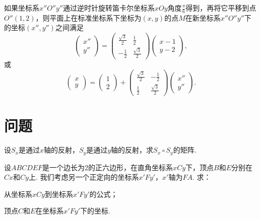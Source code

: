 \begin{example}
  如果坐标系$x''O''y''$通过逆时针旋转笛卡尔坐标系$xOy$角度$\frac\pi6$得到，再将它平移到点$O''(1,2)$，则平面上在标准坐标系下坐标为$(x,y)$的点$M$在新坐标系$x''O''y''$下的坐标$(x'',y'')$之间满足
  \[
    \begin{pmatrix}
      x'' \\
      y''
    \end{pmatrix} = \begin{pmatrix}
      \frac{\sqrt3}2 & \frac12 \\
      -\frac12 & \frac{\sqrt3}2
    \end{pmatrix}
    \begin{pmatrix}
      x-1 \\
      y-2
    \end{pmatrix},
  \]
  或
  \[
    \begin{pmatrix}
      x \\
      y
    \end{pmatrix} =
    \begin{pmatrix}
      1 \\
      2
    \end{pmatrix} +
    \begin{pmatrix}
      \frac{\sqrt3}2 & -\frac12 \\
      \frac12 & \frac{\sqrt3}2
    \end{pmatrix}
    \begin{pmatrix}
      x'' \\
      y''
    \end{pmatrix}.
  \]
\end{example}

\section{问题}
\begin{problem}
  设$S_x$是通过$x$轴的反射，$S_y$是通过$y$轴的反射，求$S_x\circ S_y$的矩阵.
\end{problem}

\begin{problem}
  设$ABCDEF$是一个边长为2的正六边形，在直角坐标系$xCy$下，顶点$B$和$E$分别在$Cx$和$Cy$上. 我们考虑另一个正定向的坐标系$x'Fy'$，$x'$轴为$FA$. 求：
  \begin{enum}
    \item 从坐标系$xCy$到坐标系$x'Fy'$的公式；
    \item 顶点$C$和$E$在坐标系$x'Fy'$下的坐标.
  \end{enum}
\end{problem}

